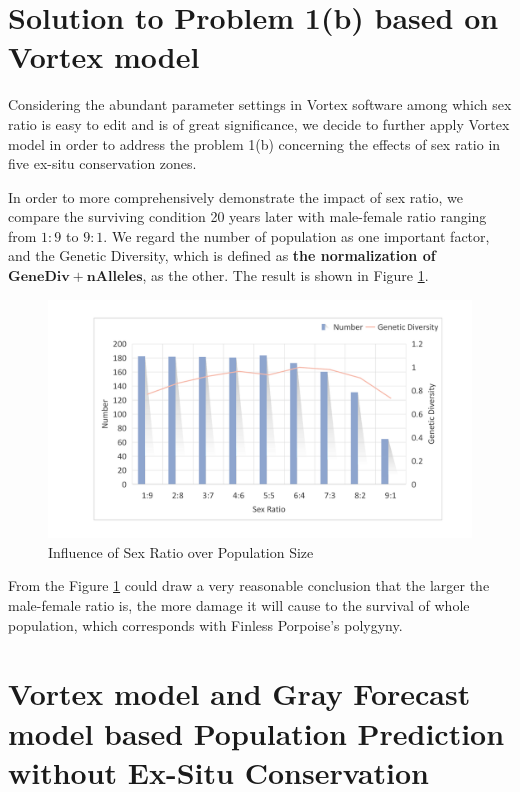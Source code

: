\documentclass{mcmthesis}
\numberwithin{figure}{section}
\numberwithin{table}{section}
\numberwithin{equation}{section}
\begin{document}
\section{Solution to Problem 1(b) based on Vortex model}
Considering the abundant parameter settings in Vortex software among which sex ratio 
is easy to edit and is of great significance, we decide to further apply Vortex model
in order to address the problem 1(b) concerning the effects of sex ratio in five ex-situ
conservation zones.
\par
In order to more comprehensively demonstrate the impact of sex ratio, 
we compare the surviving condition 20 years later with male-female ratio ranging 
from $ 1:9 $ to $ 9:1 $. We regard the number of population as one important
factor, and the Genetic Diversity, which is defined as \textbf{the normalization of}
$ \bm{GeneDiv + nAlleles} $, as the other. The result is shown in Figure \ref{Sex-Pop}.  
\begin{figure}[htbp]
  \centering
  \includegraphics*[width = 12cm]{codes/影响.pdf}
  \caption{Influence of Sex Ratio over Population Size}\label{Sex-Pop}
\end{figure}

From the Figure \ref{Sex-Pop} could draw a very reasonable conclusion that
the larger the male-female ratio is, the more damage it will cause to the
survival of whole population, which corresponds with Finless Porpoise's 
polygyny. 

\section{Vortex model and Gray Forecast model based
Population Prediction without Ex-Situ Conservation}
\end{document}
